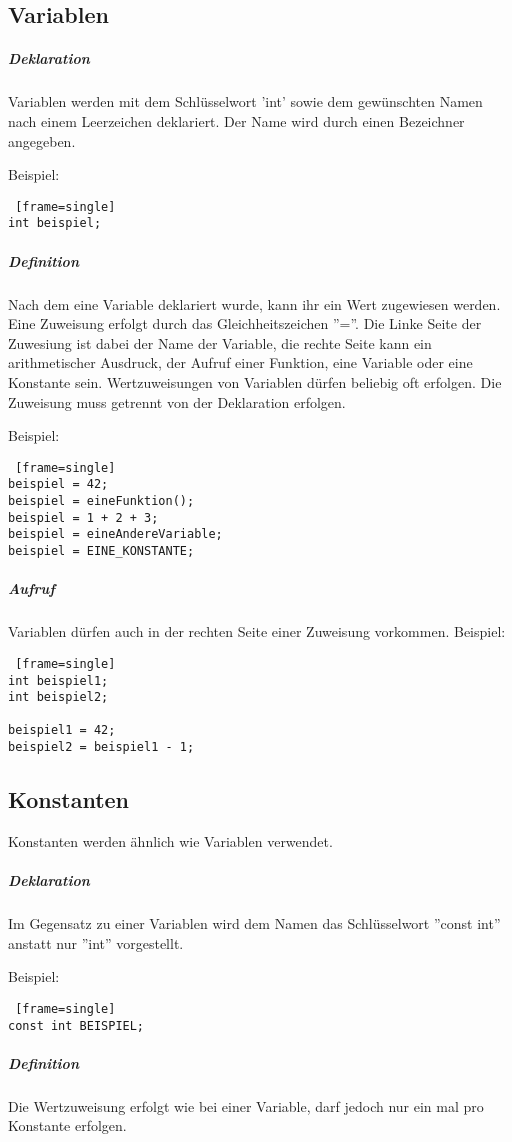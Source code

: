 \subsection*{Variablen}
\subparagraph{Deklaration}
Variablen werden mit dem Schlüsselwort 'int' sowie dem gewünschten Namen nach einem Leerzeichen deklariert.
Der Name wird durch einen Bezeichner angegeben.

Beispiel:
\begin{lstlisting} [frame=single] 
int beispiel;
\end{lstlisting}

\subparagraph{Definition}
Nach dem eine Variable deklariert wurde, kann ihr ein Wert zugewiesen werden. Eine Zuweisung erfolgt durch das Gleichheitszeichen ''=''. Die Linke Seite der Zuwesiung ist dabei der Name der Variable, die rechte Seite  kann ein arithmetischer Ausdruck, der Aufruf einer Funktion, eine Variable oder eine Konstante sein.
Wertzuweisungen von Variablen dürfen beliebig oft erfolgen.
Die Zuweisung muss getrennt von der Deklaration erfolgen.

Beispiel:
\begin{lstlisting} [frame=single] 
beispiel = 42;
beispiel = eineFunktion();
beispiel = 1 + 2 + 3;
beispiel = eineAndereVariable;
beispiel = EINE_KONSTANTE;
\end{lstlisting}

\subparagraph{Aufruf}
Variablen dürfen auch in der rechten Seite einer Zuweisung vorkommen.
Beispiel:
\begin{lstlisting} [frame=single] 
int beispiel1;
int beispiel2;

beispiel1 = 42;
beispiel2 = beispiel1 - 1;
\end{lstlisting}


\subsection{Konstanten}
Konstanten werden ähnlich wie Variablen verwendet.

\subparagraph{Deklaration}
Im Gegensatz zu einer Variablen wird dem Namen das Schlüsselwort ''const int'' anstatt nur ''int'' vorgestellt.

Beispiel:
\begin{lstlisting} [frame=single] 
const int BEISPIEL;
\end{lstlisting}

\subparagraph{Definition}
Die Wertzuweisung erfolgt wie bei einer Variable, darf jedoch nur ein mal pro Konstante erfolgen.
 

